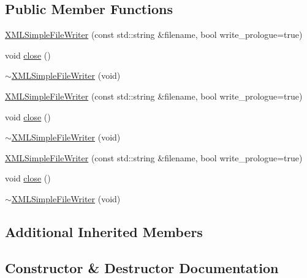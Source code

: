 \subsection*{Public Member Functions}
\begin{DoxyCompactItemize}
\item 
\mbox{\hyperlink{classXMLWriterAPI_1_1XMLSimpleFileWriter_a8ce4f6691f7e2e803a14e0cba906a4b7}{X\+M\+L\+Simple\+File\+Writer}} (const std\+::string \&filename, bool write\+\_\+prologue=true)
\item 
void \mbox{\hyperlink{classXMLWriterAPI_1_1XMLSimpleFileWriter_a1ecf825fdd568364791b6d6a4de5ca74}{close}} ()
\item 
\mbox{\hyperlink{classXMLWriterAPI_1_1XMLSimpleFileWriter_a8a18cf3ea74f63a4f84a434237109e68}{$\sim$\+X\+M\+L\+Simple\+File\+Writer}} (void)
\item 
\mbox{\hyperlink{classXMLWriterAPI_1_1XMLSimpleFileWriter_a8ce4f6691f7e2e803a14e0cba906a4b7}{X\+M\+L\+Simple\+File\+Writer}} (const std\+::string \&filename, bool write\+\_\+prologue=true)
\item 
void \mbox{\hyperlink{classXMLWriterAPI_1_1XMLSimpleFileWriter_a1ecf825fdd568364791b6d6a4de5ca74}{close}} ()
\item 
\mbox{\hyperlink{classXMLWriterAPI_1_1XMLSimpleFileWriter_a8a18cf3ea74f63a4f84a434237109e68}{$\sim$\+X\+M\+L\+Simple\+File\+Writer}} (void)
\item 
\mbox{\hyperlink{classXMLWriterAPI_1_1XMLSimpleFileWriter_a8ce4f6691f7e2e803a14e0cba906a4b7}{X\+M\+L\+Simple\+File\+Writer}} (const std\+::string \&filename, bool write\+\_\+prologue=true)
\item 
void \mbox{\hyperlink{classXMLWriterAPI_1_1XMLSimpleFileWriter_a1ecf825fdd568364791b6d6a4de5ca74}{close}} ()
\item 
\mbox{\hyperlink{classXMLWriterAPI_1_1XMLSimpleFileWriter_a8a18cf3ea74f63a4f84a434237109e68}{$\sim$\+X\+M\+L\+Simple\+File\+Writer}} (void)
\end{DoxyCompactItemize}
\subsection*{Additional Inherited Members}


\subsection{Constructor \& Destructor Documentation}
\mbox{\label{classXMLWriterAPI_1_1XMLSimpleFileWriter_a8ce4f6691f7e2e803a14e0cba906a4b7}} 
